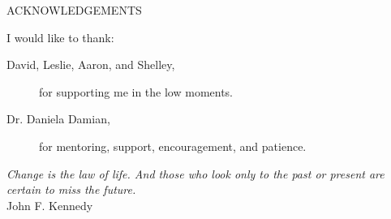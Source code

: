 \newpage
{}

\begin{center}
ACKNOWLEDGEMENTS
\end{center}

\noindent I would like to thank:
\begin{description}
\item[David, Leslie, Aaron, and Shelley,]
	for supporting me in the low moments.
\item[Dr. Daniela Damian,]
	for  mentoring, support, encouragement, and patience.
\end{description}

\begin{flushright}
\textit{Change is the law of life. And those who look only to the past or present are certain to miss the future.}
\\
John F. Kennedy \\
\end{flushright}
